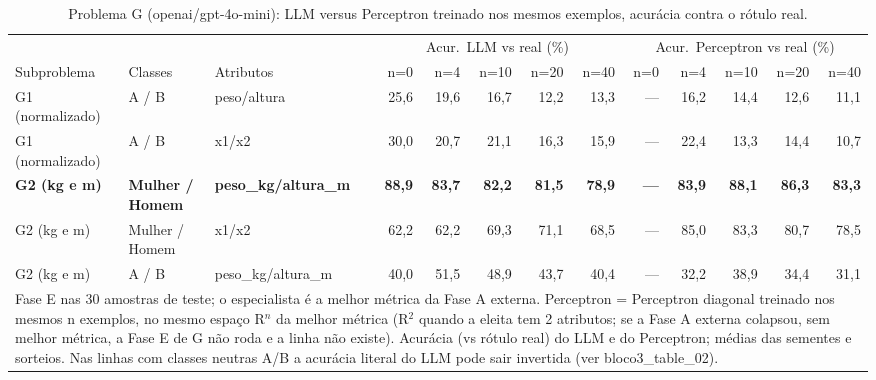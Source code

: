 \begin{table}[htbp]
\centering
\footnotesize
\caption{Problema G (openai/gpt-4o-mini): LLM versus Perceptron treinado nos mesmos exemplos, acurácia contra o rótulo real.}
\label{tab:bloco3_G_faseE_LLM_vs_perceptron_gpt4mini}
\begin{tabular}{lllrrrrrrrrrr}
\toprule
 &  &  & \multicolumn{5}{c}{Acur.\ LLM vs real (\%)} & \multicolumn{5}{c}{Acur.\ Perceptron vs real (\%)} \\ \cmidrule(lr){4-8} \cmidrule(lr){9-13}
Subproblema & Classes & Atributos & n=0 & n=4 & n=10 & n=20 & n=40 & n=0 & n=4 & n=10 & n=20 & n=40 \\
\midrule
G1 (normalizado) & A / B & peso/altura & 25,6 & 19,6 & 16,7 & 12,2 & 13,3 & — & 16,2 & 14,4 & 12,6 & 11,1 \\
G1 (normalizado) & A / B & x1/x2 & 30,0 & 20,7 & 21,1 & 16,3 & 15,9 & — & 22,4 & 13,3 & 14,4 & 10,7 \\
\textbf{G2 (kg e m)} & \textbf{Mulher / Homem} & \textbf{peso\_kg/altura\_m} & \textbf{88,9} & \textbf{83,7} & \textbf{82,2} & \textbf{81,5} & \textbf{78,9} & \textbf{—} & \textbf{83,9} & \textbf{88,1} & \textbf{86,3} & \textbf{83,3} \\
G2 (kg e m) & Mulher / Homem & x1/x2 & 62,2 & 62,2 & 69,3 & 71,1 & 68,5 & — & 85,0 & 83,3 & 80,7 & 78,5 \\
G2 (kg e m) & A / B & peso\_kg/altura\_m & 40,0 & 51,5 & 48,9 & 43,7 & 40,4 & — & 32,2 & 38,9 & 34,4 & 31,1 \\
\bottomrule
\multicolumn{13}{p{0.95\linewidth}}{\footnotesize Fase E nas 30 amostras de teste; o especialista é a melhor métrica da Fase A externa. Perceptron = Perceptron diagonal treinado nos mesmos n exemplos, no mesmo espaço R$^n$ da melhor métrica (R$^2$ quando a eleita tem 2 atributos; se a Fase A externa colapsou, sem melhor métrica, a Fase E de G não roda e a linha não existe). Acurácia (vs rótulo real) do LLM e do Perceptron; médias das sementes e sorteios. Nas linhas com classes neutras A/B a acurácia literal do LLM pode sair invertida (ver bloco3\_table\_02).} \\
\end{tabular}
\end{table}
